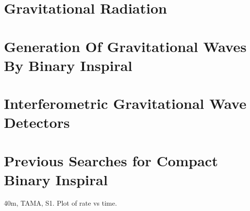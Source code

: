 
\section{Gravitational Radiation}

\section{Generation Of Gravitational Waves By Binary Inspiral}

\section{Interferometric Gravitational Wave Detectors}

\section{Previous Searches for Compact Binary Inspiral}

40m, TAMA, S1. Plot of rate vs time.
